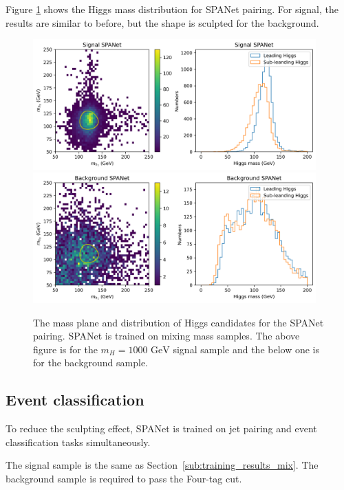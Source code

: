 \documentclass[12pt]{article}
\begin{document}
		Figure \ref{fig:Higgs_mass_new_mix_SPANET} shows the Higgs mass distribution for SPANet pairing. For signal, the results are similar to before, but the shape is sculpted for the background.
		\begin{figure}[htpb]
			\centering
			\includegraphics[width=0.97\textwidth]{Higgs_mass_res_mix_SPANET_s.png}
			\includegraphics[width=0.97\textwidth]{Higgs_mass_res_mix_SPANET_4b.png}
			\caption{The mass plane and distribution of Higgs candidates for the SPANet pairing. SPANet is trained on mixing mass samples. The above figure is for the $m_H = \text{1000 GeV}$ signal sample and the below one is for the background sample.}
			\label{fig:Higgs_mass_new_mix_SPANET}
		\end{figure}

	\subsection{Event classification}%
	\label{sub:event_classification}
		To reduce the sculpting effect, SPANet is trained on jet pairing and event classification tasks simultaneously. 

		The signal sample is the same as Section~\ref{sub:training_results_mix}. The background sample is required to pass the Four-tag cut.
\end{document}
